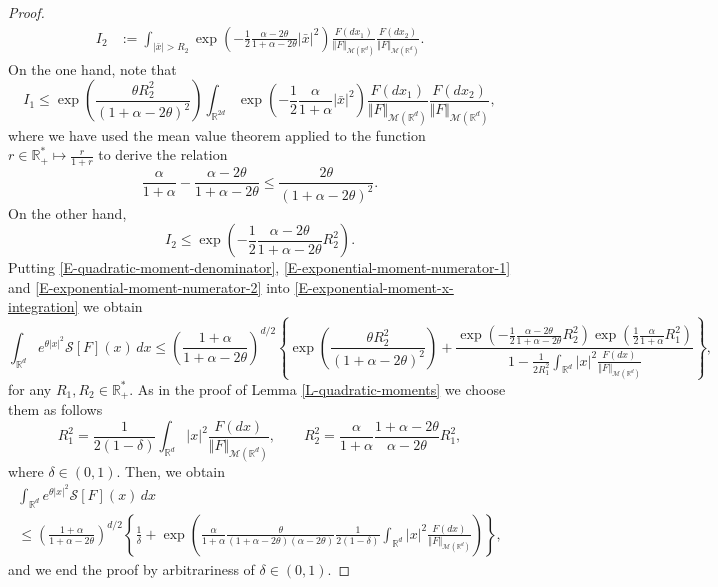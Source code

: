 \documentclass[reqno]{amsart}
\numberwithin{equation}{section}
\begin{document}
{\begin{proof}
\begin{align*}
I_2&:=\int_{\vert \bar x\vert> R_2}\exp\left(-\frac{1}{2}\frac{\alpha-2\theta}{1+\alpha-2\theta}\vert \bar x\vert^2\right)\frac{F(dx_1)}{\Vert F\Vert_{\mathcal{M}(\mathbb{R}^d)}}\frac{F(dx_2)}{\Vert F\Vert_{\mathcal{M}(\mathbb{R}^d)}}.
\end{align*}
On the one hand, note that
\begin{equation}\label{E-exponential-moment-numerator-1}
I_1\leq \exp\left(\frac{\theta R_2^2}{(1+\alpha-2\theta)^2}\right)\int_{\mathbb{R}^{2d}}\exp\left(-\frac{1}{2}\frac{\alpha}{1+\alpha}\vert \bar x\vert^2\right)\frac{F(dx_1)}{\Vert F\Vert_{\mathcal{M}(\mathbb{R}^d)}}\frac{F(dx_2)}{\Vert F\Vert_{\mathcal{M}(\mathbb{R}^d)}},
\end{equation}
where we have used the mean value theorem applied to the function $r\in \mathbb{R}_+^*\mapsto \frac{r}{1+r}$ to derive the relation
$$\frac{\alpha}{1+\alpha}-\frac{\alpha-2\theta}{1+\alpha-2\theta}\leq \frac{2\theta}{(1+\alpha-2\theta)^2}.$$
On the other hand,
\begin{equation}\label{E-exponential-moment-numerator-2}
I_2\leq \exp\left(-\frac{1}{2}\frac{\alpha-2\theta}{1+\alpha-2\theta}R_2^2\right).
\end{equation}
Putting \eqref{E-quadratic-moment-denominator}, \eqref{E-exponential-moment-numerator-1} and \eqref{E-exponential-moment-numerator-2} into \eqref{E-exponential-moment-x-integration} we obtain
$$\int_{\mathbb{R}^d}e^{\theta\vert x\vert^2}\mathcal{S}[F](x)\,dx\leq \left(\frac{1+\alpha}{1+\alpha-2\theta}\right)^{d/2}\left\{\exp\left(\frac{\theta R_2^2}{(1+\alpha-2\theta)^2}\right)+\frac{\exp\left(-\frac{1}{2}\frac{\alpha-2\theta}{1+\alpha-2\theta}R_2^2\right)\exp\left(\frac{1}{2}\frac{\alpha}{1+\alpha}R_1^2\right)}{1-\frac{1}{2R_1^2}\int_{\mathbb{R}^d}\vert x\vert^2 \frac{F(dx)}{\Vert F\Vert_{\mathcal{M}(\mathbb{R}^d)}}}\right\},$$
for any $R_1,R_2\in \mathbb{R}_+^*.$ As in the proof of Lemma \ref{L-quadratic-moments} we choose them as follows
$$R_1^2=\frac{1}{2(1-\delta)}\int_{\mathbb{R}^d}\vert x\vert^2\frac{F(dx)}{\Vert F\Vert_{\mathcal{M}(\mathbb{R}^d)}},\qquad R_2^2=\frac{\alpha}{1+\alpha}\frac{1+\alpha-2\theta}{\alpha-2\theta}R_1^2,$$
where $\delta\in (0,1)$. Then, we obtain
\begin{multline*}
\int_{\mathbb{R}^d}e^{\theta\vert x\vert^2}\mathcal{S}[F](x)\,dx\\
\leq \left(\frac{1+\alpha}{1+\alpha-2\theta}\right)^{d/2}\left\{\frac{1}{\delta}+\exp\left(\frac{\alpha}{1+\alpha}\frac{\theta}{(1+\alpha-2\theta)(\alpha-2\theta)}\frac{1}{2(1-\delta)}\int_{\mathbb{R}^d}\vert x\vert^2\frac{F(dx)}{\Vert F\Vert_{\mathcal{M}(\mathbb{R}^d)}}\right)\right\},
\end{multline*}
and we end the proof by arbitrariness of $\delta\in (0,1)$.
\end{proof}

}
\end{document}
